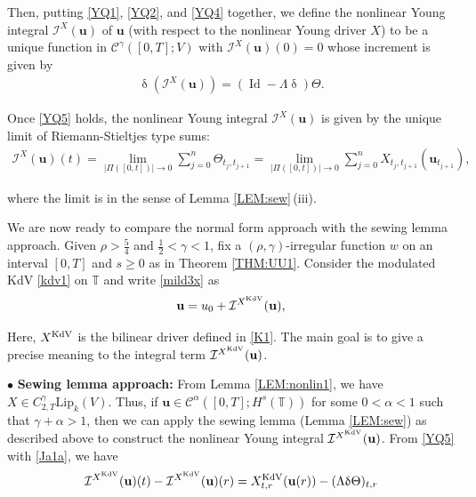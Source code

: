 \documentclass[letterpaper, 11pt,  reqno]{amsart}
\DeclareMathOperator{\Id}{Id}
\newcommand{\1}{\hspace{0.5mm}\text{I}\hspace{0.5mm}}
\newcommand{\I}{\mathcal{I}}
\newcommand{\noi}{\noindent}
\newcommand{\T}{\mathbb{T}}
\newcommand{\bul}{\bullet}
\newcommand{\CC}{\mathcal{C}}
\newcommand{\al}{\alpha}
\newcommand{\updl}{\updelta}
\newcommand{\g}{\gamma}
\newcommand{\Ld}{\Lambda}
\newcommand{\Lip}{\mathrm{Lip}}
\newcommand{\uu}{\mathbf{u}}
\newcommand{\Ta}{\Theta}
\newcommand{\KDV}{\text{\rm KdV} }
\numberwithin{equation}{section}
\numberwithin{theorem}{section}
\begin{document}
\noi
Then, 
putting
 \eqref{YQ1},  
 \eqref{YQ2},  
and \eqref{YQ4} together,   
we define the nonlinear Young integral $\I^X(\uu)$ of $\uu$
(with respect to the nonlinear Young driver $X$)
to be  a unique function 
in $ \CC^\g([0,T]; V)$
with $\I^X(\uu)(0) = 0$
whose increment is given by 
\begin{align}
\updl (\I^X(\uu))
= (\Id - \Ld \updl )\Ta.
\label{YQ5}
\end{align}





\noi
Once \eqref{YQ5} holds, 
the nonlinear Young integral $\I^X(\uu)$ 
is given by 
the unique limit of 
Riemann-Stieltjes type sums:
\begin{align}
\I^X(\uu)(t) 
= \lim_{|\Pi([0,t])|\to 0} 
\sum^n_{j=0} \Theta_{t_j,t_{j+1}}
= \lim_{|\Pi([0,t])|\to 0} 
\sum^n_{j=0} X_{t_j,t_{j+1}}(\uu_{t_{j+1}}), 
\label{YQ6}
\end{align} 
 
 
 
\noi
 where 
the limit is in the sense of Lemma \ref{LEM:sew}\,(iii).






\medskip



We are now ready to compare the normal form approach
with the sewing lemma approach.
Given  $\rho > \frac 54 $ and  $\frac 12  < \g < 1$, 
fix a 
 $(\rho,\g)$-irregular function $w$ on an interval $[0, T]$
 and $s\ge 0$ as in Theorem \ref{THM:UU1}.
Consider the modulated KdV \eqref{kdv1} on $\T$
and write 
\eqref{mild3x}
as
\begin{equation}
\uu = u_0 + \I^{X^\KDV}(\uu), 
\label{YZ1}
\end{equation}

\noi
Here, 
$X^\KDV$
is the bilinear driver defined in \eqref{K1}.
The main goal is to give a precise meaning
to 
the integral term $\I^{X^\KDV}(\uu)$.

\medskip

\noi
$\bul$ {\bf Sewing lemma approach:}
From 
Lemma \ref{LEM:nonlin1}, 
we have
$X\in C^\g_{2,T}\Lip_k(V)$.
Thus, 
if $\uu\in \CC^{\al}([0,T];H^s(\T))$
for some $0 < \al < 1$ such that $\g + \al > 1$, 
then
we can apply the sewing lemma 
(Lemma \ref{LEM:sew})
as described above
to construct
the nonlinear Young integral $\I^{X^\KDV}(\uu)$. 
From \eqref{YQ5} with \eqref{Ja1a}, we have 
\begin{align}
\I^{X^\KDV}(\uu)(t) - \I^{X^\KDV}(\uu)(r)
= X^\KDV_{t, r} (\uu(r)) - (\Ld \updl \Ta)_{t, r}
\label{YZ2}
\end{align}
\end{document}
